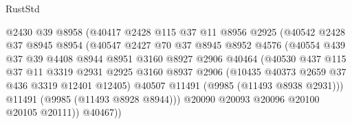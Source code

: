 \begin{lexlean}{RustStd}
\begin{coremodule}
                                @2430
                                @39
                                @8958
                                (@40417
                                  @2428
                                  @115
                                  @37
                                  @11
                                  @8956
                                  @2925
                                  (@40542
                                    @2428
                                    @37
                                    @8945
                                    @8954
                                    (@40547
                                      @2427
                                      @70
                                      @37
                                      @8945
                                      @8952
                                      @4576
                                      (@40554
                                        @439
                                        @37
                                        @39
                                        @4408
                                        @8944
                                        @8951
                                        @3160
                                        @8927
                                        @2906
                                        @40464
                                        (@40530
                                          @437
                                          @115
                                          @37
                                          @11
                                          @3319
                                          @2931
                                          @2925
                                          @3160
                                          @8937
                                          @2906
                                          (@10435 @40373 @2659 @37 @436 @3319 @12401 @12405)
                                          @40507
                                          @11491
                                          (@9985 (@11493 @8938 @2931)))
                                        @11491
                                        (@9985 (@11493 @8928 @8944)))
                                      @20090
                                      @20093
                                      @20096
                                      @20100
                                      @20105
                                      @20111))
                                  @40467))

\end{coremodule}
\end{lexlean}
